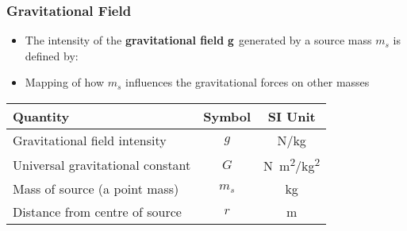 \documentclass[12pt,compress,aspectratio=169]{beamer}
\newcommand{\mb}[1]{\ensuremath\mathbf{#1}}
\begin{document}
\begin{frame}
  \frametitle{Gravitational Field}

  \begin{itemize}
  \item The intensity of the \textbf{gravitational field} $\mb{g}$ generated by
    a source mass $m_s$ is defined by:

  \item Mapping of how $m_s$ influences the gravitational forces on other masses
%    
%
  \end{itemize}

  \vspace{-0.1in}
  \begin{center}
    \begin{tabular}{l|c|c}
      \rowcolor{pink}
      \textbf{Quantity} & \textbf{Symbol} & \textbf{SI Unit} \\ \hline
      Gravitational field intensity    & $g$   & \si{N/kg}\\
      Universal gravitational constant & $G$   & \si{N.m^2/kg^2} \\
      Mass of source (a point mass)    & $m_s$ & \si{kg} \\
      Distance from centre of source   & $r$   & \si{m} \\
    \end{tabular}
  \end{center}
\end{frame}
\end{document}
